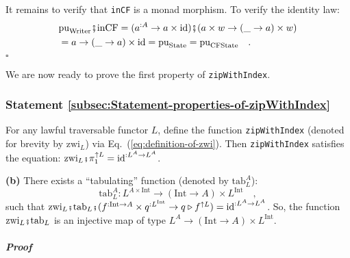 It remains to verify that \lstinline!inCF! is a monad morphism. To
verify the identity law:
\begin{align*}
 & \text{pu}_{\text{Writer}}\bef\text{inCF}=(a^{:A}\rightarrow a\times\text{id})\bef(a\times w\rightarrow(\_\rightarrow a)\times w)\\
 & =a\rightarrow(\_\rightarrow a)\times\text{id}=\text{pu}_{\text{State}}=\text{pu}_{\text{CFState}}\quad.
\end{align*}
$\square$

We are now ready to prove the first property of \lstinline!zipWithIndex!.

\subsubsection{Statement \label{subsec:Statement-properties-of-zipWithIndex}\ref{subsec:Statement-properties-of-zipWithIndex}}

For any lawful traversable functor $L$, define the function \lstinline!zipWithIndex!
(denoted for brevity by $\text{zwi}_{L}$) via Eq.~(\ref{eq:definition-of-zwi}).
Then \lstinline!zipWithIndex! satisfies the equation: $\text{zwi}_{L}\bef\pi_{1}^{\uparrow L}=\text{id}^{:L^{A}\rightarrow L^{A}}$.

\textbf{(b)} There exists a \textsf{``}tabulating\textsf{''} function (denoted by
$\text{tab}_{L}^{A}$):
\[
\text{tab}_{L}^{A}:L^{A\times\text{Int}}\rightarrow(\text{Int}\rightarrow A)\times L^{\text{Int}}\quad,
\]
such that $\text{zwi}_{L}\bef\text{tab}_{L}\bef(f^{:\text{Int}\rightarrow A}\times q^{:L^{\text{Int}}}\rightarrow q\triangleright f^{\uparrow L})=\text{id}^{:L^{A}\rightarrow L^{A}}$.
So, the function $\text{zwi}_{L}\bef\text{tab}_{L}$ is an injective
map of type $L^{A}\rightarrow(\text{Int}\rightarrow A)\times L^{\text{Int}}$.

\subparagraph{Proof}

